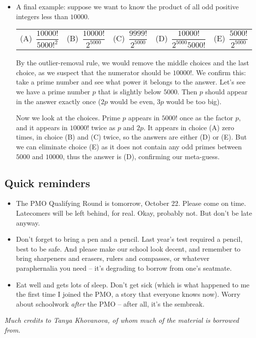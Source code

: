 \documentclass[10pt,paper=letter]{scrartcl}
\makeatletter
\newcommand{\fivech}[5]{
        \begin{tabular}{*{5}{@{}p{0.19\textwidth}}}
(A)~#1 & (B)~#2 & (C)~#3 & (D)~#4 & (E)~#5
        \end{tabular}}
\makeatother
\begin{document}
\begin{itemize}
\item A final example: suppose we want to know the product of all odd positive integers less than $10000$.

\fivech
{$\dfrac{10000!}{5000!^2}$}
{$\dfrac{10000!}{2^{5000}}$}
{$\dfrac{9999!}{2^{5000}}$}
{$\dfrac{10000!}{2^{5000}5000!}$}
{$\dfrac{5000!}{2^{5000}}$}

By the outlier-removal rule, we would remove the middle choices and the last choice, as we suspect that the numerator should be $10000!$. We confirm this: take a prime number and see what power it belongs to the answer. Let's see we have a prime number $p$ that is slightly below $5000$. Then $p$ should appear in the answer exactly once ($2p$ would be even, $3p$ would be too big).

Now we look at the choices. Prime $p$ appears in $5000!$ once as the factor $p$, and it appears in $10000!$ twice as $p$ and $2p$. It appears in choice (A) zero times, in choice (B) and (C) twice, so the answers are either (D) or (E). But we can eliminate choice (E) as it does not contain any odd primes between $5000$ and $10000$, thus the answer is (D), confirming our meta-guess.

\end{itemize}

\subsection*{Quick reminders}

\begin{itemize}

\item The PMO Qualifying Round is tomorrow, October 22. Please come on time. Latecomers will be left behind, for real. Okay, probably not. But don't be late anyway.

\item Don't forget to bring a pen and a pencil. Last year's test required a pencil, best to be safe. And please make our school look decent, and remember to bring sharpeners and erasers, rulers and compasses, or whatever paraphernalia you need -- it's degrading to borrow from one's seatmate.

\item Eat well and gets lots of sleep. Don't get sick (which is what happened to me the first time I joined the PMO, a story that everyone knows now). Worry about schoolwork \emph{after} the PMO -- after all, it's the sembreak.

\end{itemize}

\noindent \emph{Much credits to Tanya Khovanova, of whom much of the material is borrowed from.}
\end{document}

